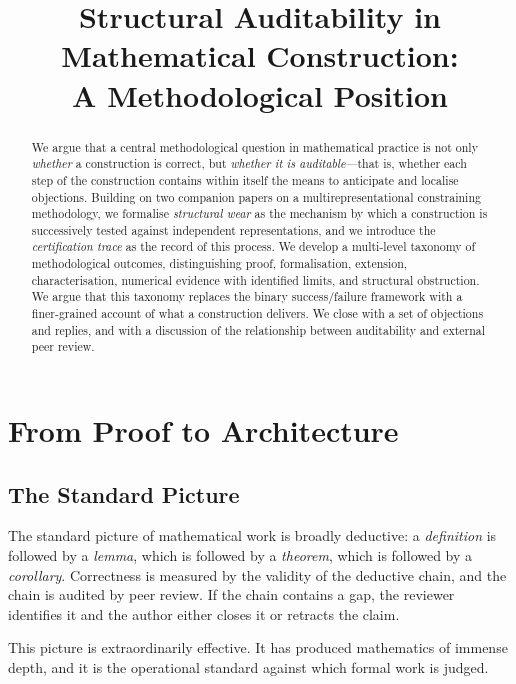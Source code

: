 \documentclass[11pt,a4paper]{article}
\title{%
  \textbf{Structural Auditability in Mathematical Construction:}\\[4pt]
  \large A Methodological Position
}
\author{}
\date{}
\theoremstyle{definition}
\theoremstyle{plain}
\begin{document}
\maketitle

\begin{abstract}
\noindent
We argue that a central methodological question in mathematical
practice is not only \emph{whether} a construction is correct, but
\emph{whether it is auditable}---that is, whether each step of the
construction contains within itself the means to anticipate and
localise objections. Building on two companion papers on a
multirepresentational constraining methodology, we formalise
\emph{structural wear} as the mechanism by which a construction is
successively tested against independent representations, and we
introduce the \emph{certification trace} as the record of this
process. We develop a multi-level taxonomy of methodological
outcomes, distinguishing proof, formalisation, extension,
characterisation, numerical evidence with identified limits, and
structural obstruction. We argue that this taxonomy replaces the
binary success/failure framework with a finer-grained account of
what a construction delivers. We close with a set of objections and
replies, and with a discussion of the relationship between
auditability and external peer review.
\end{abstract}

\tableofcontents

\section{From Proof to Architecture}
\label{sec:intro}

\subsection{The Standard Picture}

The standard picture of mathematical work is broadly deductive:
a \emph{definition} is followed by a \emph{lemma}, which is
followed by a \emph{theorem}, which is followed by a
\emph{corollary}. Correctness is measured by the validity of the
deductive chain, and the chain is audited by peer review. If the
chain contains a gap, the reviewer identifies it and the author
either closes it or retracts the claim.

This picture is extraordinarily effective. It has produced
mathematics of immense depth, and it is the operational standard
against which formal work is judged.
\end{document}
